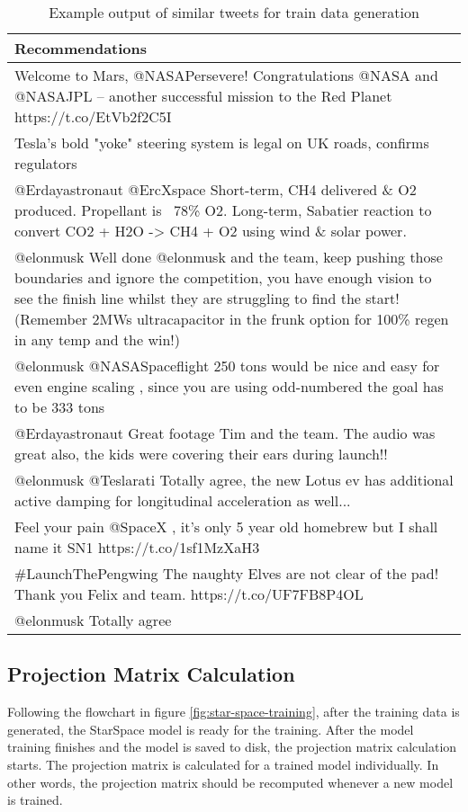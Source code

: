 \begin{table}[!htb]
    \centering
    \caption{Example output of similar tweets for train data generation}
    \label{tab:example-train-data}
    \begin{tabular}{|m{}|}
        \hline
        \textbf{Recommendations} \\
        \hline
        Welcome to Mars, @NASAPersevere! Congratulations @NASA and @NASAJPL – another successful mission to the Red Planet https://t.co/EtVb2f2C5I \\
        \hline
        Tesla’s bold "yoke" steering system is legal on UK roads, confirms regulators \\
        \hline
        @Erdayastronaut @ErcXspace Short-term, CH4 delivered \& O2 produced. Propellant is ~78\% O2. Long-term, Sabatier reaction to convert CO2 + H2O -> CH4 + O2 using wind \& solar power. \\
        \hline
        @elonmusk Well done @elonmusk and the team, keep pushing those boundaries and ignore the competition,  you have enough vision to see the finish line whilst they are struggling to find the start! (Remember 2MWs ultracapacitor in the frunk option for 100\% regen in any temp and the win!) \\
        \hline
        @elonmusk @NASASpaceflight 250 tons would be nice and easy for even engine scaling , since you are using odd-numbered the goal has to be 333 tons \\
        \hline
        @Erdayastronaut Great footage Tim and the team. The audio was great also,  the kids were covering their ears during launch!! \\
        \hline
        @elonmusk @Teslarati Totally agree, the new Lotus ev has additional active damping for longitudinal acceleration as well... \\
        \hline
        Feel your pain @SpaceX , it's only 5 year old homebrew but I shall name it SN1 https://t.co/1sf1MzXaH3 \\
        \hline
        \#LaunchThePengwing The naughty Elves are not clear of the pad! Thank you Felix and team. https://t.co/UF7FB8P4OL \\
        \hline
        @elonmusk Totally agree \\
        \hline
    \end{tabular}
\end{table}


\subsection{Projection Matrix Calculation}
\label{subsec:projection-matrix-calculation}
Following the flowchart in figure \ref{fig:star-space-training}, after the training data is generated, the StarSpace model is ready for the training. After the model training finishes and the model is saved to disk, the projection matrix calculation starts. The projection matrix is calculated for a trained model individually. In other words, the projection matrix should be recomputed whenever a new model is trained.


